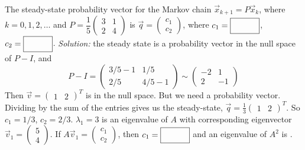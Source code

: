 \fi 
\ifnum {} 
    The steady-state probability vector for the Markov chain $\vec x_{k+1} = P\vec x_k$, where $k = 0,1,2,\ldots$ and $P=\dfrac15\begin{pmatrix} 3&1\\2&4\end{pmatrix}$ is $\vec q = \begin{pmatrix} c_1 \\c_2 \end{pmatrix}$, where $c_1 = \framebox{\strut\hspace{1cm}}$, $c_2 = \framebox{\strut\hspace{1cm}}$.
    \ifnum {} {\color{DarkBlue} \textit{Solution:} the steady state is a probability vector in the null space of $P-I$, and $$P-I = \begin{pmatrix} 3/5-1&1/5\\2/5&4/5-1 \end{pmatrix} \sim \begin{pmatrix} -2&1\\2&-1\end{pmatrix}$$ Then $\vec v = \begin{pmatrix} 1 & 2\end{pmatrix}^T$ is in the null space. But we need a probability vector. Dividing by the sum of the entries gives us the steady-state, $\vec q = \frac13 \begin{pmatrix} 1 & 2\end{pmatrix}^T$. So $c_1 = 1/3$, $c_2 = 2/3$. } \fi      
\fi 
\ifnum {}
    $\lambda_1=3$ is an eigenvalue of $A$ with corresponding eigenvector $\vec v_1 = \begin{pmatrix} 5\\4\end{pmatrix}$. If $A\vec v_1 = \begin{pmatrix} c_1\\c_2\end{pmatrix}$, then $c_1 = \framebox{\strut\hspace{1cm}}$ and an eigenvalue of $A^2$ is \framebox{\strut\hspace{1cm}}. 
    
